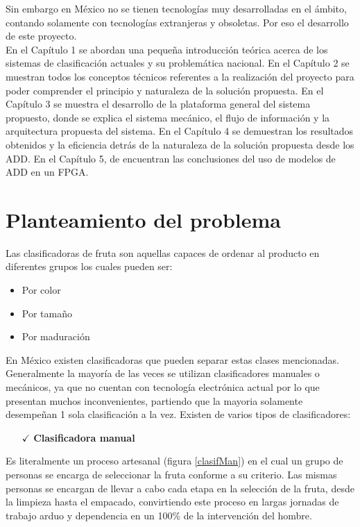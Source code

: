 \documentclass[twoside,spanish,ESP,MSc]{plantillaLabUPV}
\theoremstyle{definition}
\begin{document}
Sin embargo en México no se tienen tecnologías muy desarrolladas en el ámbito, contando solamente con tecnologías extranjeras y obsoletas. Por eso el desarrollo de este proyecto.\\


En el Capítulo 1 se abordan una pequeña introducción teórica acerca de los sistemas de clasificación actuales y su problemática nacional. En el Capítulo 2 se muestran todos los conceptos técnicos referentes a la realización del proyecto para poder comprender el principio y naturaleza de la solución propuesta. En el Capítulo 3 se muestra el desarrollo de la plataforma general del sistema propuesto, donde se explica el sistema mecánico, el flujo de información y la arquitectura propuesta del sistema. En el Capítulo 4 se demuestran los resultados obtenidos y la eficiencia detrás de la naturaleza de la solución propuesta desde los ADD. En el Capítulo 5, de encuentran las conclusiones del uso de modelos de ADD en un FPGA.




\section{Planteamiento del problema}
Las clasificadoras de fruta son aquellas capaces de ordenar al producto en diferentes grupos los cuales pueden ser:

\begin{itemize}
\itemsep0em
	\item Por color
	\item Por tamaño
	\item Por maduración
\end{itemize}

En México existen clasificadoras que pueden separar estas clases mencionadas. Generalmente la mayoría de las veces se utilizan clasificadores manuales o mecánicos, ya que no cuentan con tecnología electrónica actual por lo que presentan muchos inconvenientes, partiendo que la mayoria solamente desempeñan 1 sola clasificación a la vez. Existen de varios tipos de clasificadores:

\begin{itemize}
	\item[$\checkmark$]{\bf Clasificadora manual}
\end{itemize}
Es literalmente un proceso artesanal (figura \ref{clasifMan}) en el cual un grupo de personas  se encarga de seleccionar la fruta conforme a su criterio. Las mismas personas se encargan de llevar a cabo cada etapa en la selección de la fruta, desde la limpieza hasta el empacado, convirtiendo este proceso en largas jornadas de trabajo arduo y dependencia en un 100\% de la intervención del hombre.\\
\end{document}
